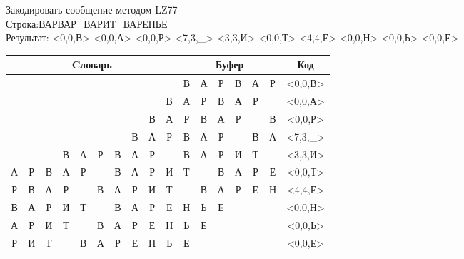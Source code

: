 \documentclass[a4paper, 12pt]{article}
\begin{document}
Закодировать сообщение методом LZ77\\
Строка:ВАРВАР\_ВАРИТ\_ВАРЕНЬЕ\\
Результат: <0,0,В> <0,0,А> <0,0,Р> <7,3,\_> <3,3,И> <0,0,Т> <4,4,Е> <0,0,Н> <0,0,Ь> <0,0,Е>\\
\begin{table}[h!]
\centering
\begin{tabular}{|c|c|c|c|c|c|c|c|c|c|c|c|c|c|c|c|c|} 
\hline
\multicolumn{10}{|c|}{Cловарь} & \multicolumn{6}{c|}{Буфер} & Код  \\ \hline
  &   &   &   &   &   &   &   &   &   & \cellcolor[HTML]{8CE4F6} В & А & Р & В & А & Р & <0,0,В>
\\ \hline
  &   &   &   &   &   &   &   &   & В & \cellcolor[HTML]{8CE4F6} А & Р & В & А & Р &   & <0,0,А>
\\ \hline
  &   &   &   &   &   &   &   & В & А & \cellcolor[HTML]{8CE4F6} Р & В & А & Р &   & В & <0,0,Р>
\\ \hline
  &   &   &   &   &   &   & \cellcolor[HTML]{FFFF00} В & \cellcolor[HTML]{FFFF00} А & \cellcolor[HTML]{FFFF00} Р & \cellcolor[HTML]{FFFF00} В & \cellcolor[HTML]{FFFF00} А & \cellcolor[HTML]{FFFF00} Р & \cellcolor[HTML]{8CE4F6}   & В & А & <7,3,\_>
\\ \hline
  &   &   & \cellcolor[HTML]{FFFF00} В & \cellcolor[HTML]{FFFF00} А & \cellcolor[HTML]{FFFF00} Р & В & А & Р &   & \cellcolor[HTML]{FFFF00} В & \cellcolor[HTML]{FFFF00} А & \cellcolor[HTML]{FFFF00} Р & \cellcolor[HTML]{8CE4F6} И & Т &   & <3,3,И>
\\ \hline
А & Р & В & А & Р &   & В & А & Р & И & \cellcolor[HTML]{8CE4F6} Т &   & В & А & Р & Е & <0,0,Т>
\\ \hline
Р & В & А & Р & \cellcolor[HTML]{FFFF00}   & \cellcolor[HTML]{FFFF00} В & \cellcolor[HTML]{FFFF00} А & \cellcolor[HTML]{FFFF00} Р & И & Т & \cellcolor[HTML]{FFFF00}   & \cellcolor[HTML]{FFFF00} В & \cellcolor[HTML]{FFFF00} А & \cellcolor[HTML]{FFFF00} Р & \cellcolor[HTML]{8CE4F6} Е & Н & <4,4,Е>
\\ \hline
В & А & Р & И & Т &   & В & А & Р & Е & \cellcolor[HTML]{8CE4F6} Н & Ь & Е &   &   &   & <0,0,Н>
\\ \hline
А & Р & И & Т &   & В & А & Р & Е & Н & \cellcolor[HTML]{8CE4F6} Ь & Е &   &   &   &   & <0,0,Ь>
\\ \hline
Р & И & Т &   & В & А & Р & Е & Н & Ь & \cellcolor[HTML]{8CE4F6} Е &   &   &   &   &   & <0,0,Е>
\\ \hline
\end{tabular}
\end{table}
\end{document}
